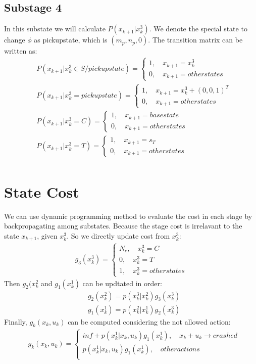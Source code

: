 \documentclass[fleqn,12pt, a4paper]{article}
\theoremstyle{definition}
\numberwithin{equation}{section}
\begin{document}
\subsection{Substage 4}
In this substate we will calculate $P(x_{k+1}|x_k^3)$. We denote the special state to change $\phi$ as pickupstate, which is $(m_p,n_p,0)$. The transition matrix can be written as:
\begin{align*}
&P(x_{k+1}|x_k^3\in S/pickupstate)=
\begin{cases}
1, \quad x_{k+1}=x_k^3\\
0, \quad x_{k+1}=otherstates
\end{cases}\\
&P(x_{k+1}|x_k^3=pickupstate)=
\begin{cases}
1, \quad x_{k+1}=x_k^3+(0,0,1)^T\\
0, \quad x_{k+1}=otherstates
\end{cases}\\
&P(x_{k+1}|x_k^3=C)=
\begin{cases}
1, \quad x_{k+1}=basestate\\
0, \quad x_{k+1}=otherstates
\end{cases}\\
&P(x_{k+1}|x_k^3=T)=
\begin{cases}
1, \quad x_{k+1}=s_T\\
0, \quad x_{k+1}=otherstates
\end{cases}\\
\end{align*}


\section{State Cost}
We can use dynamic programming method to evaluate the cost in each stage by backpropagating among substates.
Because the stage cost is irrelavant to the state $x_{k+1}$, given $x_k^3$. So we directly update cost from $x_k^3$:
\begin{align*}
g_3(x_k^3) = 
\begin{cases}
N_c, \quad x_k^3=C\\
0, \quad x_k^3=T\\
1, \quad x_k^3=otherstates
\end{cases}
\end{align*}
Then $g_2(x_k^2$ and $g_1(x_k^1)$ can be updtated in order:
\begin{align*}
&g_2(x_k^2) = p(x_k^3|x_k^2)g_3(x_k^3)\\
&g_1(x_k^1) = p(x_k^2|x_k^1)g_2(x_k^3)
\end{align*}
Finally, $g_k(x_k,u_k)$ can be computed considering the not allowed action:
\begin{align*}
&g_k(x_k, u_k) = 
\begin{cases}
inf+p(x_k^1|x_k,u_k)g_1(x_k^1), \quad x_k+u_k\rightarrow crashed\\
p(x_k^1|x_k,u_k)g_1(x_k^1), \quad otheractions\\
\end{cases}
\end{align*}
\end{document}
